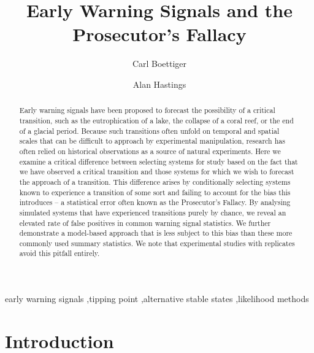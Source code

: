 \documentclass[authoryear,5p]{elsarticle}
\begin{document}
\begin{frontmatter}
  \title{Early Warning Signals and the Prosecutor's Fallacy}
  \author[cpb]{Carl Boettiger}
  \author[esp]{Alan Hastings}
  \address[cpb]{Center for Population Biology, 1 Shields Avenue, University of California, Davis, CA, 95616 United States.}
  \address[esp]{Department of Environmental Science and Policy, University of California, Davis} 


  \begin{abstract}

  Early warning signals have been proposed to forecast the possibility
  of a critical transition, such as the eutrophication of a lake,
  the collapse of a coral reef, or the end
  of a glacial period.  Because such transitions often unfold on temporal and spatial scales that
  can be difficult to approach by experimental manipulation, research
  has often relied on historical observations as a source of natural experiments.
  Here we examine a critical difference between selecting systems for
  study based on the fact that we have observed a critical transition
  and those systems for which we wish to forecast the approach of a
  transition. This difference arises by conditionally selecting systems
  known to experience a transition of some sort and failing to account
  for the bias this introduces -- a statistical error often known as the
  Prosecutor's Fallacy.  By analysing simulated systems that have
  experienced transitions purely by chance, we reveal an elevated rate
  of false positives in common warning signal statistics. We further
  demonstrate a model-based approach that is less subject to this bias
  than these more commonly used summary statistics.
  We note that experimental studies with replicates avoid this 
  pitfall entirely.  
  
 
  \end{abstract}

  \begin{keyword}
early warning signals \sep tipping point \sep alternative stable states \sep likelihood methods 
   \end{keyword}
 \end{frontmatter}

\section{Introduction}
\end{document}
